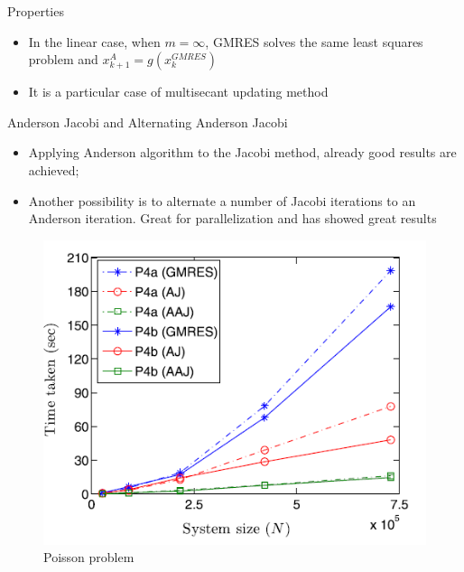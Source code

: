 \documentclass{beamer}
\begin{document}
				\begin{frame}{Properties}
					\begin{itemize}
						\item In the linear case, when $m = \infty$, GMRES solves the same least squares problem and $x_{k+1}^A = g(x_k^{GMRES})$
						\item It is a particular case of multisecant updating method \cite{p3}
					\end{itemize}
					
					
				\end{frame}
				
				
				\begin{frame}{Anderson Jacobi and Alternating Anderson Jacobi}
					\begin{itemize}
						\item Applying Anderson algorithm to the Jacobi method, already good results are achieved;
						\item Another possibility is to alternate a number of Jacobi iterations to an Anderson iteration. Great for parallelization and has showed great results \cite{p2}
					\end{itemize}
					
					\begin{figure}
						\includegraphics[scale= 0.5]{AAJ.png}
						\caption{Poisson problem \cite{p2}}
					\end{figure}
				\end{frame}
				
\end{document}
